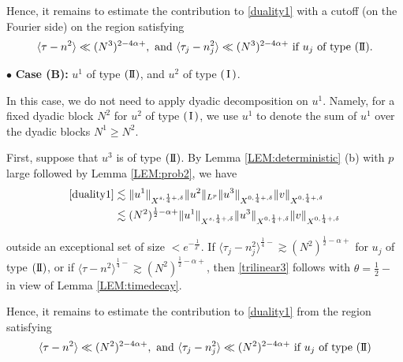 \documentclass[11pt]{amsart}
\numberwithin{equation}{section} \numberwithin{theorem}{section}
\begin{document}
Hence, it remains to estimate the contribution to \eqref{duality1}
with a cutoff (on the Fourier side)  
on the region
satisfying
\begin{equation}
	\label{case0} {\langle {\tau - n^2} \rangle} \ll (N^3)^{2-4{\alpha}+}, \text{ and } {\langle {\tau_j - n_j^2} \rangle} \ll (N^3)^{2-4{\alpha}+} \text{ if } u_j \text{ of type }({\text{I \hspace{-2.8mm} I} }). 
\end{equation}

\medskip

{
\noindent} $\bullet$ {\bf Case (B):} $u^1$ of type $({\text{I \hspace{-2.8mm} I} })$, and $u^2$ of type $({\hspace{0.5mm}\text{I}\hspace{0.5mm}})$.

In this case, we do not need to apply dyadic decomposition on $u^1$.
Namely, for a fixed dyadic block $N^2$ for $u^2$ of type $({\hspace{0.5mm}\text{I}\hspace{0.5mm}})$, 
we use $u^1$ to denote the sum of $u^1$ over the dyadic blocks $N^1 \geq N^2$.

First, suppose that $u^3$ is of type $({\text{I \hspace{-2.8mm} I} })$. 
By Lemma \ref{LEM:deterministic} (b) with $p$ large followed by
Lemma \ref{LEM:prob2}, we have 
\begin{align*}
	\eqref{duality1} & \lesssim 
	\|u^1\|_{X^{s, \frac{1}{4}+, {\delta}}} \|u^2\|_{L^p} \|u^3\|_{X^{0, \frac{1}{4}+, {\delta}}}\|v\|_{X^{0, \frac{1}{4}+, {\delta}}} \\
	& \lesssim (N^2)^{\frac{1}{2}-{\alpha}+}\|u^1\|_{X^{s, \frac{1}{4}+, {\delta}}} \|u^3\|_{X^{0, \frac{1}{4}+, {\delta}}}
	\|v\|_{X^{0, \frac{1}{4}+, {\delta}}} 
\end{align*}

{
\noindent} outside an exceptional set of size $<e^{-\frac{1}{{\delta}^c}}$. If ${\langle {\tau_j - n_j^2} \rangle}^{\frac{1}{4}-} \gtrsim (N^2)^{\frac{1}{2}-{\alpha}+}$ for $u_j$ of type $({\text{I \hspace{-2.8mm} I} })$, or if ${\langle {\tau - n^2} \rangle}^{\frac{1}{4}-} \gtrsim (N^2)^{\frac{1}{2}-{\alpha}+}$, then \eqref{trilinear3} follows with $\theta = \frac{1}{2}-$ in view of Lemma \ref{LEM:timedecay}. 

Hence, it remains to estimate the contribution to \eqref{duality1}
from the region satisfying
\begin{equation}
	\label{caseA} {\langle {\tau - n^2} \rangle} \ll (N^2)^{2-4{\alpha}+}, \text{ and } {\langle {\tau_j - n_j^2} \rangle} \ll (N^2)^{2-4{\alpha}+} \text{ if } u_j \text{ of type }({\text{I \hspace{-2.8mm} I} }) 
\end{equation}
\end{document}
